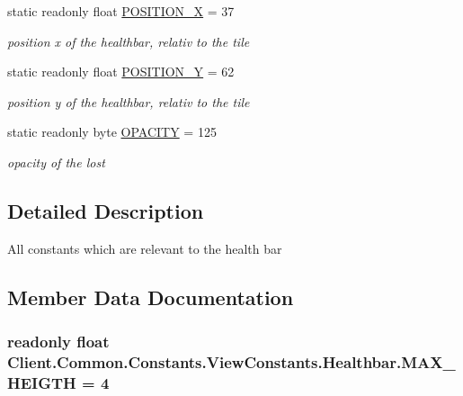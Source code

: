 \begin{DoxyCompactItemize}
static readonly float \hyperlink{classClient_1_1Common_1_1Constants_1_1ViewConstants_1_1Healthbar_ade754baed84f2531b270446a68e1d2ef}{P\+O\+S\+I\+T\+I\+O\+N\+\_\+\+X} = 37
\begin{DoxyCompactList}\small\item\em position x of the healthbar, relativ to the tile \end{DoxyCompactList}\item 
static readonly float \hyperlink{classClient_1_1Common_1_1Constants_1_1ViewConstants_1_1Healthbar_ad4bca0878f84bf09e2372de152b15354}{P\+O\+S\+I\+T\+I\+O\+N\+\_\+\+Y} = 62
\begin{DoxyCompactList}\small\item\em position y of the healthbar, relativ to the tile \end{DoxyCompactList}\item 
static readonly byte \hyperlink{classClient_1_1Common_1_1Constants_1_1ViewConstants_1_1Healthbar_af0cfbb3562957fc39c32055df1f96fa4}{O\+P\+A\+C\+I\+T\+Y} = 125
\begin{DoxyCompactList}\small\item\em opacity of the lost \end{DoxyCompactList}\end{DoxyCompactItemize}


\subsection{Detailed Description}
All constants which are relevant to the health bar 



\subsection{Member Data Documentation}
\hypertarget{classClient_1_1Common_1_1Constants_1_1ViewConstants_1_1Healthbar_a44eeb8c9930130408877a84f0e7686d9}{}
\subsubsection[{M\+A\+X\+\_\+\+H\+E\+I\+G\+T\+H}]{\setlength{\rightskip}{0pt plus 5cm}readonly float Client.\+Common.\+Constants.\+View\+Constants.\+Healthbar.\+M\+A\+X\+\_\+\+H\+E\+I\+G\+T\+H = 4\hspace{0.3cm}{\ttfamily [static]}}\label{classClient_1_1Common_1_1Constants_1_1ViewConstants_1_1Healthbar_a44eeb8c9930130408877a84f0e7686d9}


